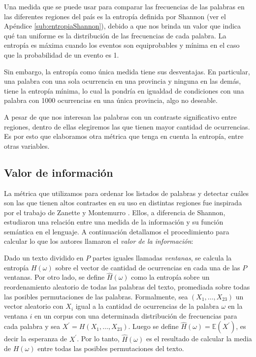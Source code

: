 Una medida que se puede usar para comparar las frecuencias de las palabras en las diferentes regiones del país es la entropía definida por Shannon (ver el Apéndice \ref{sub:entropiaShannon}), debido a que nos brinda un valor que indica qué tan uniforme es la distribución de las frecuencias de cada palabra. La entropía es máxima cuando los eventos son equiprobables y mínima en el caso que la probabilidad de un evento es 1.

Sin embargo, la entropía como única medida tiene sus desventajas. En particular, una palabra con una sola ocurrencia en una provincia y ninguna en las demás, tiene la entropía mínima, lo cual la pondría en igualdad de condiciones con una palabra con 1000 ocurrencias en una única provincia, algo no deseable.

A pesar de que nos interesan las palabras con un contraste significativo entre regiones, dentro de ellas elegiremos las que tienen mayor cantidad de ocurrencias. Es por esto que elaboramos otra métrica que tenga en cuenta la entropía, entre otras variables.


\subsection{Valor de información}
La métrica que utilizamos para ordenar los listados de palabras y detectar cuáles son
las que tienen altos contrastes en su uso en distintas regiones fue inspirada por el
trabajo de Zanette y Montemurro \cite{montemurro2010towards}.
Ellos, a diferencia de Shannon, estudiaron una relación entre una medida de la información y su función semántica en el lenguaje.
A continuación detallamos el procedimiento para calcular lo que los autores llamaron
el \textit{valor de la información}:

Dado un texto dividido en $P$ partes iguales llamadas \textit{ventanas}, se calcula la entropía  $H(\omega)$ sobre el vector de cantidad de ocurrencias en cada una de las $P$ ventanas.
Por otro lado, se define $\widehat{H}(\omega)$ como la entropía sobre un reordenamiento aleatorio de todas las palabras del texto, promediada sobre todas las posibles permutaciones de las palabras. Formalmente, sea $(X_{1},\dots,X_{23})$ un vector aleatorio con $X_{i}$ igual a la cantidad de ocurrencias de la palabra $\omega$ en la ventana $i$ en un corpus con una determinada distribución de frecuencias para cada palabra y sea $X^\prime = H(X_1,\dots,X_{23})$. Luego se define $\widehat{H}(\omega) = \mathbb{E}(X^\prime)$, es decir la esperanza de $X^\prime$. Por lo tanto, $\widehat{H}(\omega)$ es el resultado de calcular la media de $H(\omega)$ entre todas las posibles permutaciones del texto.


